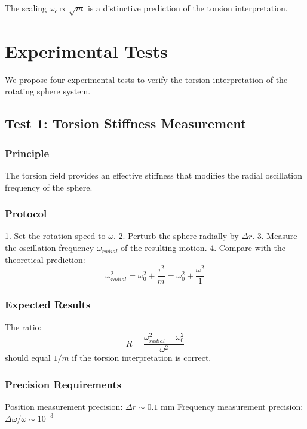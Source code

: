 \documentclass[12pt,a4paper]{article}
\begin{document}
The scaling $\omega_c \propto \sqrt{m}$ is a distinctive prediction of the torsion interpretation.

\section{Experimental Tests}
\label{sec:tests}

We propose four experimental tests to verify the torsion interpretation of the rotating sphere system.

\subsection{Test 1: Torsion Stiffness Measurement}

\subsubsection{Principle}

The torsion field provides an effective stiffness that modifies the radial oscillation frequency of the sphere.

\subsubsection{Protocol}

1. Set the rotation speed to $\omega$.
2. Perturb the sphere radially by $\Delta r$.
3. Measure the oscillation frequency $\omega_{radial}$ of the resulting motion.
4. Compare with the theoretical prediction:
\begin{equation}
    \omega_{radial}^2 = \omega_0^2 + \frac{\tau^2}{m} = \omega_0^2 + \frac{\omega^2}{1}
\end{equation}

\subsubsection{Expected Results}

The ratio:
\begin{equation}
    R = \frac{\omega_{radial}^2 - \omega_0^2}{\omega^2}
\end{equation}
should equal $1/m$ if the torsion interpretation is correct.

\subsubsection{Precision Requirements}

Position measurement precision: $\Delta r \sim 0.1$ mm  
Frequency measurement precision: $\Delta\omega/\omega \sim 10^{-3}$
\end{document}
